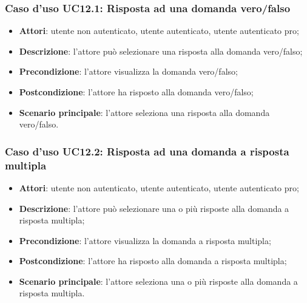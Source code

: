 \subsubsection{Caso d'uso UC12.1: Risposta ad una domanda vero/falso}
\begin{itemize}
\item \textbf{Attori}: utente non autenticato, utente autenticato, utente autenticato pro;
\item \textbf{Descrizione}: l'attore può selezionare una risposta alla domanda vero/falso;
\item \textbf{Precondizione}: l'attore visualizza la domanda vero/falso;
\item \textbf{Postcondizione}: l'attore ha risposto alla domanda vero/falso;
\item \textbf{Scenario principale}: l'attore seleziona una risposta alla domanda vero/falso.
\end{itemize}

\subsubsection{Caso d'uso UC12.2: Risposta ad una domanda a risposta multipla}
\begin{itemize}
\item \textbf{Attori}: utente non autenticato, utente autenticato, utente autenticato pro;
\item \textbf{Descrizione}: l'attore può selezionare una o più risposte alla domanda a risposta multipla;
\item \textbf{Precondizione}: l'attore visualizza la domanda a risposta multipla;
\item \textbf{Postcondizione}: l'attore ha risposto alla domanda a risposta multipla;
\item \textbf{Scenario principale}: l'attore seleziona una o più risposte alla domanda a risposta multipla.
\end{itemize}

